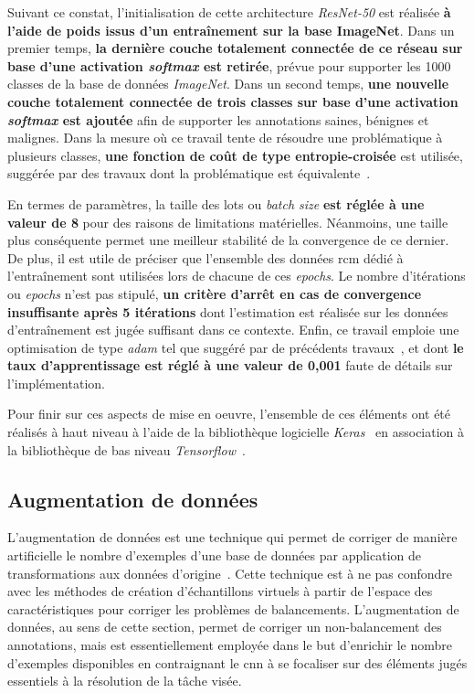 Suivant ce constat, l'initialisation de cette architecture \textit{ResNet-50} est réalisée \textbf{à l'aide de poids issus d'un entraînement sur la base ImageNet}. Dans un premier temps, \textbf{la dernière couche totalement connectée de ce réseau sur base d'une activation \textit{softmax} est retirée}, prévue pour supporter les 1000 classes de la base de données \textit{ImageNet}. Dans un second temps, \textbf{une nouvelle couche totalement connectée de trois classes sur base d'une activation \textit{softmax} est ajoutée} afin de supporter les annotations saines, bénignes et malignes. Dans la mesure où ce travail tente de résoudre une problématique à plusieurs classes, \textbf{une fonction de coût de type entropie-croisée} est utilisée, suggérée par des travaux dont la problématique est équivalente~\cite{Barbu2018,Park2019}.\par

En termes de paramètres, la taille des lots ou \textit{batch size} \textbf{est réglée à une valeur de 8} pour des raisons de limitations matérielles. Néanmoins, une taille plus conséquente permet une meilleur stabilité de la convergence de ce dernier. De plus, il est utile de préciser que l'ensemble des données \gls{rcm} dédié à l'entraînement sont utilisées lors de chacune de ces \textit{epochs}. Le nombre d'itérations ou \textit{epochs} n'est pas stipulé, \textbf{un critère d'arrêt en cas de convergence insuffisante après 5 itérations} dont l'estimation est réalisée sur les données d'entraînement est jugée suffisant dans ce contexte. Enfin, ce travail emploie une optimisation de type \textit{adam} tel que suggéré par de précédents travaux~\cite{Barbu2018,Park2019}, et dont \textbf{le taux d'apprentissage est réglé à une valeur de 0,001} faute de détails sur l'implémentation.\par

Pour finir sur ces aspects de mise en oeuvre, l'ensemble de ces éléments ont été réalisés à haut niveau à l'aide de la bibliothèque logicielle \textit{Keras}~\cite{chollet2015} en association à la bibliothèque de bas niveau \textit{Tensorflow}~\cite{tensorflow2015}.\par

\subsection{Augmentation de données}
L'augmentation de données est une technique qui permet de corriger de manière artificielle le nombre d'exemples d'une base de données par application de transformations aux données d'origine~\cite{Wong2016,Taylor2018}. Cette technique est à ne pas confondre avec les méthodes de création d'échantillons virtuels à partir de l'espace des caractéristiques pour corriger les problèmes de balancements. L'augmentation de données, au sens de cette section, permet de corriger un non-balancement des annotations, mais est essentiellement employée dans le but d'enrichir le nombre d'exemples disponibles en contraignant le \gls{cnn} à se focaliser sur des éléments jugés essentiels à la résolution de la tâche visée.\par

